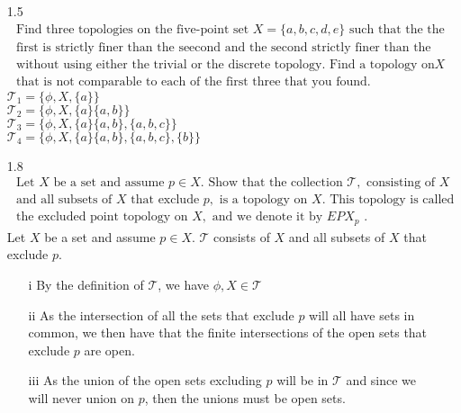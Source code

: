 \documentclass[12pt]{article}
\begin{document}
\begin{enumerate}
	\item[1.5] $ \begin{array} { l } { \text { Find three topologies on the five-point set } X = \{ a , b , c , d , e \} \text { such that the the } } \\ { \text { first is strictly finer than the seecond and the second strictly finer than the third, } } \\ { \text { without using either the trivial or the discrete topology. Find a topology on } X } \\ { \text { that is not comparable to each of the first three that you found. } } \end{array} $\\
	$ \mathcal{ T }_1 = \{\phi,X,\{a\}\} $\\
	$ \mathcal{ T }_2 = \{\phi,X,\{a\}\{a,b\}\} $\\
	$ \mathcal{ T }_3 = \{\phi,X,\{a\}\{a,b\},\{a,b,c\}\} $\\
	$ \mathcal{ T }_4 = \{\phi,X,\{a\}\{a,b\},\{a,b,c\},\{b\}\} $\\
	\item[1.8]$  \begin{array} { l } { \text { Let } X \text { be a set and assume } p \in X . \text { Show that the collection } \mathcal { T } , \text { consisting of } X } \\ { \text { and all subsets of } X \text { that exclude } p , \text { is a topology on } X . \text { This topology is called } } \\ { \text { the excluded point topology on } X , \text { and we denote it by } E P X _ { p } \text { . } } \end{array} $\\
	Let $ X $ be a set and assume $ p\in X $. $ \mathcal{ T } $ consists of $ X $ and all subsets of $ X $ that exclude $ p $.
	\begin{enumerate}
		\item[i] By the definition of $ \mathcal{ T } $, we have $ \phi,X\in\mathcal{ T } $
		\item[ii] As the intersection of all the sets that exclude $ p $ will all have sets in common, we then have that the finite intersections of the open sets that exclude $ p $ are open.
		\item[iii] As the union of the open sets excluding $ p $ will be in $ \mathcal{ T } $ and since we will never union on $ p $, then the unions must be open sets.
	\end{enumerate}
	

\end{enumerate}
\end{document}

